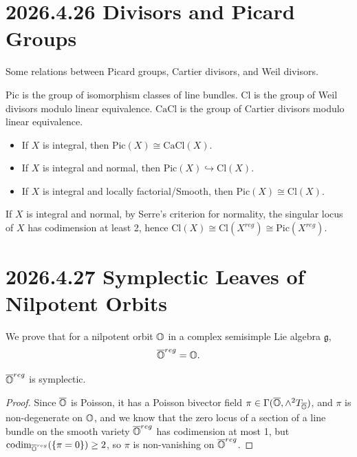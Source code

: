 \documentclass[12pt]{amsart}
\numberwithin{equation}{section}
\newcommand{\fg}{\mathfrak{g}} \newcommand{\fh}{\mathfrak{h}} \newcommand{\fk}{\mathfrak{k}}
\renewcommand{\bar}{\overline}
\begin{document}
\section{2026.4.26 Divisors and Picard Groups}


Some relations between Picard groups, Cartier divisors, and Weil divisors.

$\mathrm{Pic}$ is the group of isomorphism classes of line bundles. $\mathrm{Cl}$ is the group of Weil divisors modulo linear equivalence. $\mathrm{CaCl}$ is the group of Cartier divisors modulo linear equivalence.

\begin{itemize}
  \item If $X$ is integral, then $\mathrm{Pic}(X) \cong \mathrm{CaCl}(X)$.
  \item If $X$ is integral and normal, then $\mathrm{Pic}(X) \hookrightarrow  \mathrm{Cl}(X)$.
  \item If $X$ is integral and locally factorial/Smooth, then $\mathrm{Pic}(X) \cong \mathrm{Cl}(X)$.
\end{itemize}

If $X$ is integral and normal, by Serre's criterion for normality, the singular locus of $X$ has codimension at least 2, hence $\mathrm{Cl}(X) \cong \mathrm{Cl}(X^{reg}) \cong \mathrm{Pic}(X^{reg})$. 

\section{2026.4.27 Symplectic Leaves of Nilpotent Orbits}

\cite{Losev2022Topics}

We prove that for a nilpotent orbit ${\mathbb {O}}$ in a complex semisimple Lie algebra $\fg$,
\[
  \bar{\BO}^{reg} = \BO.
\]

\begin{lem}
  $\bar{\BO}^{reg}$ is symplectic.
\end{lem}

\begin{proof}
  Since $\bar{\BO}$ is Poisson, it has a Poisson bivector field $\pi \in \Gamma(\bar{\BO}, \wedge^2 T_{\bar{\BO}})$, and $\pi$ is non-degenerate on ${\mathbb {O}}$, and we know that the zero locus of a section of a line bundle on the smooth variety $\bar{\BO}^{reg}$ has codimension at most 1, but $\mathrm{codim}_{\bar{\BO}^{reg}}(\{ \pi = 0 \}) \geq 2$, so $\pi$ is non-vanishing on $\bar{\BO}^{reg}$.
\end{proof}
\end{document}
